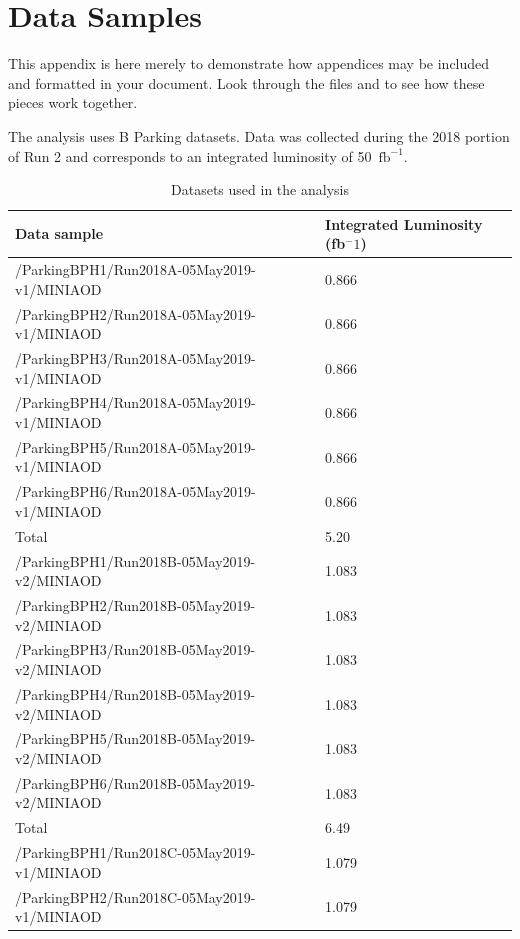 \chapter{Data Samples}

This appendix is here merely to demonstrate how appendices may be
included and formatted in your document.  Look through the files
 and  to see how these pieces work
together.



The analysis uses B Parking datasets. Data was
collected during the 2018 portion of Run 2 and corresponds to an integrated luminosity of
 50~$\mathrm{fb}^{-1}$.

\begin{table}[htb!]
  \caption{Datasets used in the analysis}
  \begin{center}
    \begin{tabular}{l|l}\hline
      Data sample & Integrated Luminosity (fb$^-1$)\\
      \hline
      /ParkingBPH1/Run2018A-05May2019-v1/MINIAOD  & 0.866 \\
      /ParkingBPH2/Run2018A-05May2019-v1/MINIAOD  & 0.866 \\
      /ParkingBPH3/Run2018A-05May2019-v1/MINIAOD  & 0.866 \\
      /ParkingBPH4/Run2018A-05May2019-v1/MINIAOD  & 0.866 \\
      /ParkingBPH5/Run2018A-05May2019-v1/MINIAOD  & 0.866 \\
      /ParkingBPH6/Run2018A-05May2019-v1/MINIAOD  & 0.866 \\
      Total & 5.20\\
      \hline
      /ParkingBPH1/Run2018B-05May2019-v2/MINIAOD  & 1.083 \\
      /ParkingBPH2/Run2018B-05May2019-v2/MINIAOD  & 1.083 \\
      /ParkingBPH3/Run2018B-05May2019-v2/MINIAOD  & 1.083 \\
      /ParkingBPH4/Run2018B-05May2019-v2/MINIAOD  & 1.083 \\
      /ParkingBPH5/Run2018B-05May2019-v2/MINIAOD  & 1.083 \\
      /ParkingBPH6/Run2018B-05May2019-v2/MINIAOD  & 1.083 \\
      Total & 6.49\\
      \hline
      /ParkingBPH1/Run2018C-05May2019-v1/MINIAOD  & 1.079 \\
      /ParkingBPH2/Run2018C-05May2019-v1/MINIAOD  & 1.079 \\

\end{tabular}
\end{center}
\end{table}
